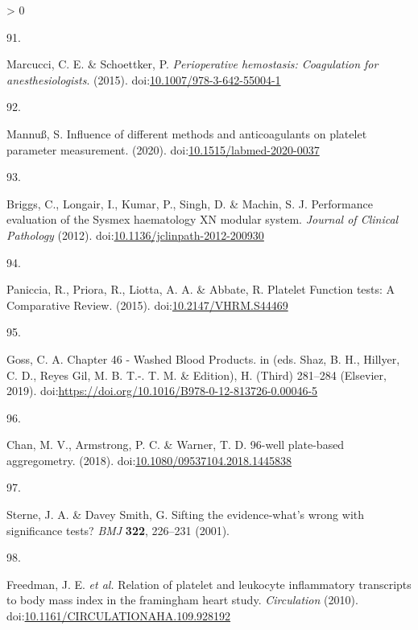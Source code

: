 \documentclass[11pt,twoside]{bristolthesis}
\newlength{\cslhangindent}
\newlength{\csllabelwidth}
\newenvironment{CSLReferences}[2] %
 {%
  \setlength{\parindent}{0pt}
  \ifodd #1 \everypar{\setlength{\hangindent}{\cslhangindent}}\ignorespaces\fi
  \ifnum #2 > 0
  \setlength{\parskip}{#2\baselineskip}
  \fi
 }%
 {}
\newcommand{\CSLLeftMargin}[1]{\parbox[t]{\csllabelwidth}{#1}}
\newcommand{\CSLRightInline}[1]{\parbox[t]{\linewidth - \csllabelwidth}{#1}\break}
\begin{document}
\begin{CSLReferences}{0}{0}
\leavevmode\hypertarget{ref-Marcucci2015}{}%
\CSLLeftMargin{91. }
\CSLRightInline{Marcucci, C. E. \& Schoettker, P. \emph{{Perioperative hemostasis: Coagulation for anesthesiologists}}. (2015). doi:\href{https://doi.org/10.1007/978-3-642-55004-1}{10.1007/978-3-642-55004-1}}

\leavevmode\hypertarget{ref-Mannuuxdf2020}{}%
\CSLLeftMargin{92. }
\CSLRightInline{Mannuß, S. {Influence of different methods and anticoagulants on platelet parameter measurement}. (2020). doi:\href{https://doi.org/10.1515/labmed-2020-0037}{10.1515/labmed-2020-0037}}

\leavevmode\hypertarget{ref-Briggs2012}{}%
\CSLLeftMargin{93. }
\CSLRightInline{Briggs, C., Longair, I., Kumar, P., Singh, D. \& Machin, S. J. {Performance evaluation of the Sysmex haematology XN modular system}. \emph{Journal of Clinical Pathology} (2012). doi:\href{https://doi.org/10.1136/jclinpath-2012-200930}{10.1136/jclinpath-2012-200930}}

\leavevmode\hypertarget{ref-Paniccia2015}{}%
\CSLLeftMargin{94. }
\CSLRightInline{Paniccia, R., Priora, R., Liotta, A. A. \& Abbate, R. {Platelet Function tests: A Comparative Review}. (2015). doi:\href{https://doi.org/10.2147/VHRM.S44469}{10.2147/VHRM.S44469}}

\leavevmode\hypertarget{ref-Goss2019}{}%
\CSLLeftMargin{95. }
\CSLRightInline{Goss, C. A. {Chapter 46 - Washed Blood Products}. in (eds. Shaz, B. H., Hillyer, C. D., Reyes Gil, M. B. T.-. T. M. \& Edition), H. (Third) 281--284 (Elsevier, 2019). doi:\url{https://doi.org/10.1016/B978-0-12-813726-0.00046-5}}

\leavevmode\hypertarget{ref-Chan2018}{}%
\CSLLeftMargin{96. }
\CSLRightInline{Chan, M. V., Armstrong, P. C. \& Warner, T. D. 96-well plate-based aggregometry. (2018). doi:\href{https://doi.org/10.1080/09537104.2018.1445838}{10.1080/09537104.2018.1445838}}

\leavevmode\hypertarget{ref-Sterne2001}{}%
\CSLLeftMargin{97. }
\CSLRightInline{Sterne, J. A. \& Davey Smith, G. {Sifting the evidence-what's wrong with significance tests?} \emph{BMJ} \textbf{322}, 226--231 (2001).}

\leavevmode\hypertarget{ref-Freedman2010}{}%
\CSLLeftMargin{98. }
\CSLRightInline{Freedman, J. E. \emph{et al.} {Relation of platelet and leukocyte inflammatory transcripts to body mass index in the framingham heart study}. \emph{Circulation} (2010). doi:\href{https://doi.org/10.1161/CIRCULATIONAHA.109.928192}{10.1161/CIRCULATIONAHA.109.928192}}


\end{CSLReferences}
\end{document}
